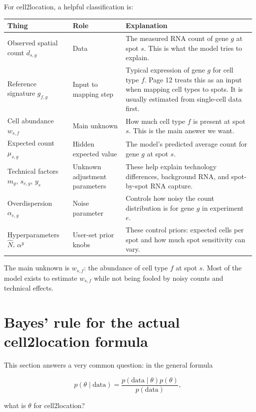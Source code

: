 \documentclass[11pt]{article}
\newcommand{\Data}{\text{data}}
\begin{document}
For cell2location, a helpful classification is:

\begin{longtable}{p{}p{}p{}}
\toprule
Thing & Role & Explanation \\
\midrule
Observed spatial count $d_{s,g}$ & Data & The measured RNA count of gene $g$ at spot $s$. This is what the model tries to explain. \\
Reference signature $g_{f,g}$ & Input to mapping step & Typical expression of gene $g$ for cell type $f$. Page 12 treats this as an input when mapping cell types to spots. It is usually estimated from single-cell data first. \\
Cell abundance $w_{s,f}$ & Main unknown & How much cell type $f$ is present at spot $s$. This is the main answer we want. \\
Expected count $\mu_{s,g}$ & Hidden expected value & The model's predicted average count for gene $g$ at spot $s$. \\
Technical factors $m_g$, $s_{e,g}$, $y_s$ & Unknown adjustment parameters & These help explain technology differences, background RNA, and spot-by-spot RNA capture. \\
Overdispersion $\alpha_{e,g}$ & Noise parameter & Controls how noisy the count distribution is for gene $g$ in experiment $e$. \\
Hyperparameters $\hat N$, $\alpha^y$ & User-set prior knobs & These control priors: expected cells per spot and how much spot sensitivity can vary. \\
\bottomrule
\end{longtable}

\begin{bigidea}
The main unknown is $w_{s,f}$: the abundance of cell type $f$ at spot $s$. Most of the model exists to estimate $w_{s,f}$ while not being fooled by noisy counts and technical effects.
\end{bigidea}


\section{Bayes' rule for the actual cell2location formula}
\label{sec:bayes-rule-cell2location}

This section answers a very common question: in the general formula

\[
p(\theta\mid \Data)=\frac{p(\Data\mid \theta)p(\theta)}{p(\Data)},
\]

what is \(\theta\) for cell2location?
\end{document}
